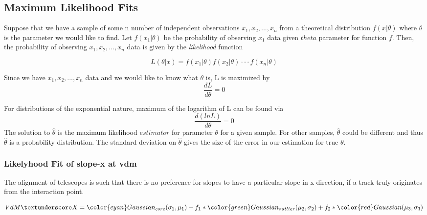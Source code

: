 \subsection{Maximum Likelihood Fits} \label{sec:mlfit}

Suppose that we have a sample of some n number of independent observations $x_{1}, x_{2}, ..., x_{n}$ from a theoretical distribution $f(x | \theta)$ where $\theta$ is the parameter we would like to find. Let $f(x_{1} | \theta)$ be the probability of observing $x_{1}$ data given $theta$ parameter for function $f$. Then, the probability of observing $x_{1}, x_{2},...,x_{n}$ data is given by the \emph{likelihood} function

\begin{equation}
L(\theta | x) = f(x_{1} | \theta) f(x_{2} | \theta) \cdot \cdot \cdot f(x_{n} | \theta)
\end{equation}

Since we have $x_{1}, x_{2},...,x_{n}$ data and we would like to know what $\theta$ is, L is maximized by 
$$
\frac{dL}{d\theta} = 0
$$

For distributions of the exponential nature, maximum of  the logarithm of L can be found via
$$
\frac{d(lnL)}{d\theta} = 0
$$
The solution to $\hat{\theta}$ is the maximum likelihood $estimator$ for parameter $\theta$ for a given sample. For other samples, $\hat{\theta}$ could be different and thus  $\hat{\theta}$ is a probability distribution. The standard deviation on  $\hat{\theta}$ gives the size of the error in our estimation for true  $\theta$.




\subsubsection{Likelyhood Fit of slope-x at vdm}

The alignment of telescopes is such that there is no preference for slopes to have a particular slope in x-direction, if a track truly originates from the interaction point.

$$
VdM \textunderscore X = {\color {cyan}Gaussian_{core}(\sigma_{1}, \mu_{1})} + f_{1}* {\color {green} Gaussian_{outlier}(\mu_{2},\sigma_{2})}
+ f_{2} * {\color {red} Gaussian(\mu_{3},\sigma_{3})}
$$



